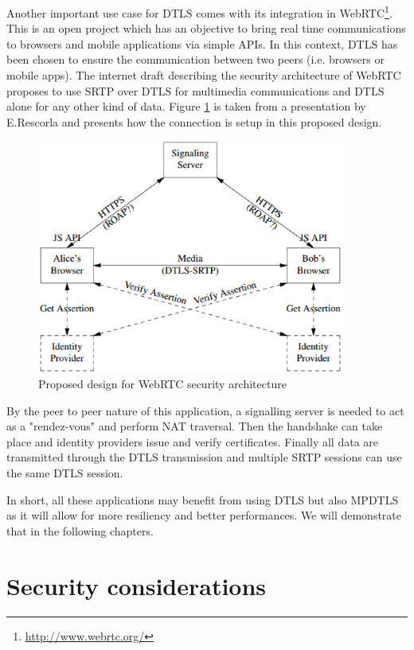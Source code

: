 Another important use case for DTLS comes with its integration in WebRTC\footnote{\url{http://www.webrtc.org/}}. This is an open project which has an objective to bring real time communications to browsers and mobile applications via simple APIs. In this context, DTLS has been chosen to ensure the communication between two peers (i.e. browsers or mobile apps). The internet draft describing the security architecture of WebRTC \cite{ietf-rtcweb-security-arch} proposes to use SRTP over DTLS for multimedia communications and DTLS alone for any other kind of data. Figure \ref{fig:webrtc} is taken from a presentation \cite{rescorla2011proposed} by E.Rescorla and  presents how the connection is setup in this proposed design.  

\begin{figure}[!ht]
\centering
\includegraphics[width=0.9\textwidth]{images/webrtc.eps}
\caption{Proposed design for WebRTC security architecture}
\label{fig:webrtc}
\end{figure}

By the peer to peer nature of this application, a signalling server is needed to act as a "rendez-vous" and perform NAT traversal. Then the handshake can take place and identity providers issue and verify certificates. Finally all data are transmitted through the DTLS transmission and multiple SRTP sessions can use the same DTLS session. 


In short, all these applications may benefit from using DTLS but also MPDTLS as it will allow for more resiliency and better performances. We will demonstrate that in the following chapters.

\section{Security considerations}

